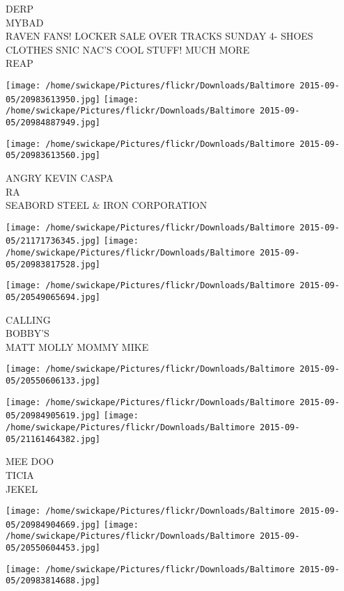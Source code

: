 \documentclass[10pt,letterpaper]{article}
\begin{document}
DERP\\
MYBAD\\
RAVEN FANS!  LOCKER SALE OVER TRACKS SUNDAY 4{-} SHOES CLOTHES SNIC NAC'S COOL STUFF!  MUCH MORE\\
REAP
\pagebreak

\texttt{[image: /home/swickape/Pictures/flickr/Downloads/Baltimore 2015-09-05/20983613950.jpg]}
\texttt{[image: /home/swickape/Pictures/flickr/Downloads/Baltimore 2015-09-05/20984887949.jpg]}

\vspace{0.25in}
\texttt{[image: /home/swickape/Pictures/flickr/Downloads/Baltimore 2015-09-05/20983613560.jpg]}

ANGRY KEVIN CASPA\\
RA\\
SEABORD STEEL \& IRON CORPORATION
\pagebreak

\texttt{[image: /home/swickape/Pictures/flickr/Downloads/Baltimore 2015-09-05/21171736345.jpg]}
\texttt{[image: /home/swickape/Pictures/flickr/Downloads/Baltimore 2015-09-05/20983817528.jpg]}

\texttt{[image: /home/swickape/Pictures/flickr/Downloads/Baltimore 2015-09-05/20549065694.jpg]}

CALLING\\
BOBBY'S\\
MATT MOLLY MOMMY MIKE
\pagebreak

\texttt{[image: /home/swickape/Pictures/flickr/Downloads/Baltimore 2015-09-05/20550606133.jpg]}

\vspace{0.25in}
\texttt{[image: /home/swickape/Pictures/flickr/Downloads/Baltimore 2015-09-05/20984905619.jpg]}
\texttt{[image: /home/swickape/Pictures/flickr/Downloads/Baltimore 2015-09-05/21161464382.jpg]}

MEE DOO\\
TICIA\\
JEKEL
\pagebreak

\texttt{[image: /home/swickape/Pictures/flickr/Downloads/Baltimore 2015-09-05/20984904669.jpg]}
\texttt{[image: /home/swickape/Pictures/flickr/Downloads/Baltimore 2015-09-05/20550604453.jpg]}

\vspace{0.25in}
\texttt{[image: /home/swickape/Pictures/flickr/Downloads/Baltimore 2015-09-05/20983814688.jpg]}
\end{document}
